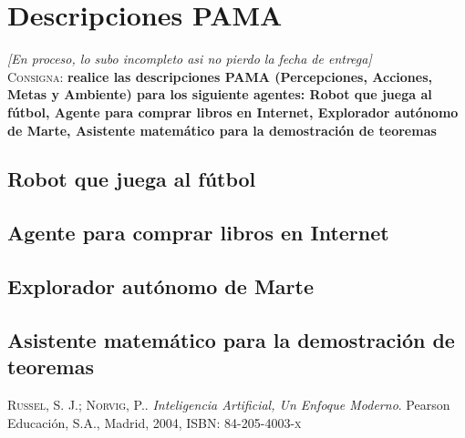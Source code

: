 \documentclass{article}
\begin{document}
\section{Descripciones PAMA}
\label{sec:PAMA}
\textit{[En proceso, lo subo incompleto asi  no pierdo la fecha de entrega]}\\
\textsc{Consigna}: \textbf{realice las descripciones PAMA (Percepciones, Acciones, Metas y Ambiente) para los siguiente agentes: Robot que juega al f\'utbol, Agente para comprar libros en Internet, Explorador aut\'onomo de Marte, Asistente matem\'atico para la demostraci\'on de teoremas}
\subsection{Robot que juega al f\'utbol}
\subsection{Agente para comprar libros en Internet}
\subsection{Explorador aut\'onomo de Marte}
\subsection{Asistente matem\'atico para la demostraci\'on de teoremas}


\newpage
\begin{thebibliography}{99}
	\textsc{Russel, S. J.; Norvig, P.}. \textit{Inteligencia Artificial, Un Enfoque Moderno}. Pearson Educaci\'on, S.A., Madrid, 2004, \textsc{ISBN: 84-205-4003-x}
\end{thebibliography}
\end{document}
